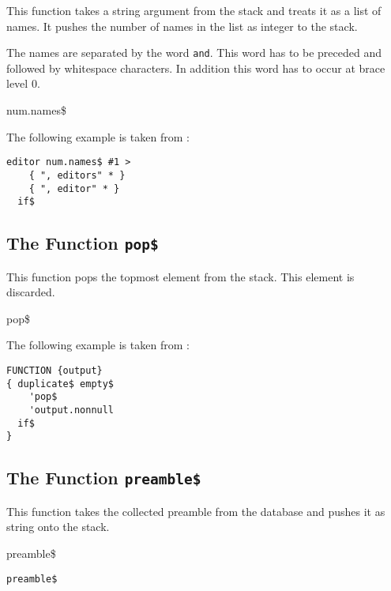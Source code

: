 This function takes a string argument from the stack and treats it as
a list of names. It pushes the number of names in the list as integer
to the stack.

The names are separated by the word \texttt{and}. This word
has to be preceded and followed by whitespace characters. In addition
this word has to occur at brace level 0.

\begin{BstFunction}{num.names\$}
\end{BstFunction}

The following example is taken from :

\begin{lstlisting}[language=bst]
  editor num.names$ #1 >
    { ", editors" * }
    { ", editor" * }
  if$
\end{lstlisting}\fctIndex{>}\fctIndex{*}


\subsection{The Function \texttt{pop\$}}%

This function pops the topmost element from the stack. This element is
discarded.

\begin{BstFunction}{pop\$}
\end{BstFunction}

The following example is taken from :

\begin{lstlisting}[language=bst]
FUNCTION {output}
{ duplicate$ empty$
    'pop$
    'output.nonnull
  if$
}
\end{lstlisting}

\subsection{The Function \texttt{preamble\$}}%

This function takes the collected preamble from the database and
pushes it as string onto the stack.

\begin{BstFunction}{preamble\$}
\end{BstFunction}

\begin{lstlisting}[language=bst]
  preamble$
\end{lstlisting}


